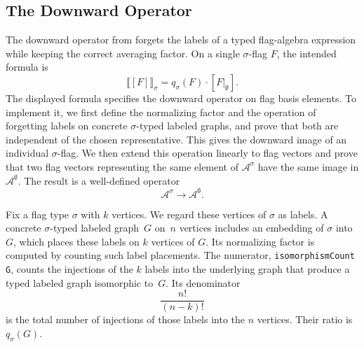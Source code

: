 \documentclass{article}
\newcommand{\lean}[1]{\texttt{#1}}
\begin{document}
\subsection{The Downward Operator}
\label{sec:formal-downward}

The downward operator from  forgets the
labels of a typed flag-algebra expression while keeping the correct averaging
factor.  On a single $\sigma$-flag $F$, the intended formula is
\[
  \llbracket [F] \rrbracket_\sigma = q_\sigma(F)\cdot [F|_\emptyset].
\]
The displayed formula specifies the downward operator on flag basis elements.
To implement it, we first define the normalizing factor and the operation of
forgetting labels on concrete $\sigma$-typed labeled graphs, and prove that
both are independent of the chosen representative.  This gives the downward
image of an individual $\sigma$-flag.  We then extend this operation linearly
to flag vectors and prove that two flag vectors representing the same element
of $\mathcal{A}^\sigma$ have the same image in $\mathcal{A}^\emptyset$.  The
result is a well-defined operator
\[
  \mathcal{A}^\sigma\longrightarrow\mathcal{A}^\emptyset.
\]

Fix a flag type $\sigma$ with $k$ vertices. We regard
these vertices of $\sigma$ as labels.  A concrete $\sigma$-typed labeled
graph~$G$ on~$n$ vertices includes an embedding of $\sigma$ into $G$, which
places these labels on $k$ vertices of $G$.  Its normalizing factor is
computed by counting such label placements.  The numerator,
\lean{isomorphismCount G}, counts the injections of the $k$ labels into the
underlying graph that produce a typed labeled graph isomorphic to~$G$.  Its
denominator
\[
  \frac{n!}{(n-k)!}
\]
is the total number of injections of those labels into the $n$ vertices.
Their ratio is $q_\sigma(G)$.
\end{document}
